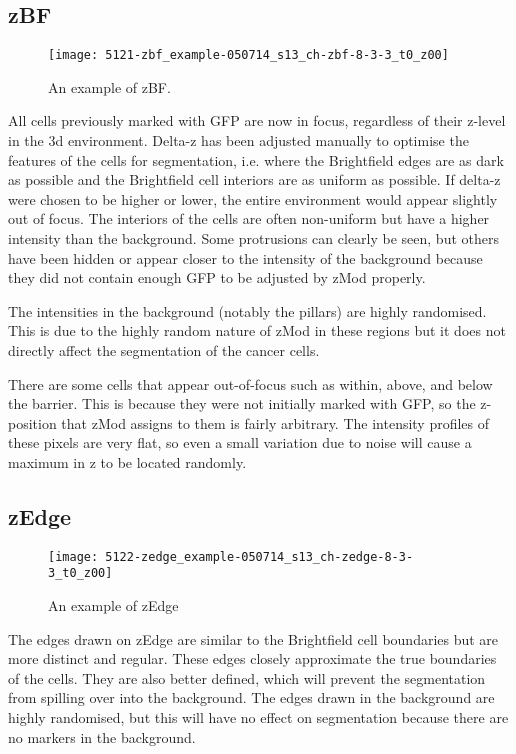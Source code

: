 \subsection{zBF}

\begin{figure}[htbp!]
\centering
\texttt{[image: 5121-zbf\_example-050714\_s13\_ch-zbf-8-3-3\_t0\_z00]}
\caption{An example of zBF.}
\label{fig:zbf_example}
\end{figure}

All cells previously marked with GFP are now in focus, regardless of their z-level in the 3d environment. Delta-z has been adjusted manually to optimise the features of the cells for segmentation, i.e. where the Brightfield edges are as dark as possible and the Brightfield cell interiors are as uniform as possible. If delta-z were chosen to be higher or lower, the entire environment would appear slightly out of focus. The interiors of the cells are often non-uniform but have a higher intensity than the background. Some protrusions can clearly be seen, but others have been hidden or appear closer to the intensity of the background because they did not contain enough GFP to be adjusted by zMod properly.

The intensities in the background (notably the pillars) are highly randomised. This is due to the highly random nature of zMod in these regions but it does not directly affect the segmentation of the cancer cells.

There are some cells that appear out-of-focus such as within, above, and below the barrier. This is because they were not initially marked with GFP, so the z-position that zMod assigns to them is fairly arbitrary. The intensity profiles of these pixels are very flat, so even a small variation due to noise will cause a maximum in z to be located randomly.

\subsection{zEdge}

\begin{figure}[htbp!]
\centering
\texttt{[image: 5122-zedge\_example-050714\_s13\_ch-zedge-8-3-3\_t0\_z00]}
\caption{An example of zEdge}
\label{fig:zedge_example}
\end{figure}

The edges drawn on zEdge are similar to the Brightfield cell boundaries but are more distinct and regular. These edges closely approximate the true boundaries of the cells. They are also better defined, which will prevent the segmentation from spilling over into the background. The edges drawn in the background are highly randomised, but this will have no effect on segmentation because there are no markers in the background.

